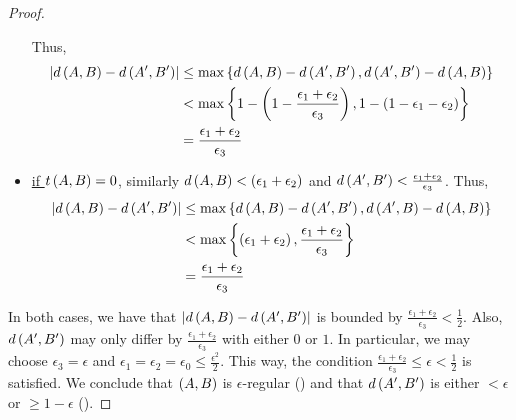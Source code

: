 \begin{lemma}[Lemma 5.17]
\begin{proof}
\begin{itemize}
                    Thus,
                    \begin{align*}
                        \left| d \left( A,B \right) - d \left( A',B' \right) \right|
                            & \leq \max \left\{ d \left( A,B \right) - d \left( A',B' \right), d \left( A',B' \right) - d \left( A,B \right) \right\} \\
                            & < \max \left\{  1 - \left( 1 - \frac{\epsilon_1 + \epsilon_2}{\epsilon_3} \right),
                                1 - \left( 1 - \epsilon_1 - \epsilon_2 \right) \right\} \\
                            & = \frac{\epsilon_1 + \epsilon_2}{\epsilon_3}
                    \end{align*}
                \item \underline{if $t\left( A,B \right) = 0$}, similarly $d\left( A,B \right) < \left( \epsilon_1 + \epsilon_2 \right)$
                    and $d \left( A',B' \right) < \frac{\epsilon_1 + \epsilon_2}{\epsilon_3}$.
                    Thus,
                    \begin{align*}
                        \left| d \left( A,B \right) - d \left( A',B' \right) \right|
                            & \leq \max \left\{ d \left( A,B \right) - d \left( A',B' \right), d \left( A',B \right) - d \left( A,B \right) \right\} \\
                            & < \max \left\{ \left( \epsilon_1 + \epsilon_2 \right), \frac{\epsilon_1 + \epsilon_2}{\epsilon_3} \right\} \\
                            & = \frac{\epsilon_1 + \epsilon_2}{\epsilon_3}
                    \end{align*}
            \end{itemize}
            In both cases, we have that $\left| d \left( A,B \right) - d \left( A',B' \right) \right|$ is bounded by
            $\frac{\epsilon_1 + \epsilon_2}{\epsilon_3} < \frac{1}{2}$.
            Also, $d \left( A', B' \right)$ may only differ by $\frac{\epsilon_1 + \epsilon_2}{\epsilon_3}$ with either
            $0$ or $1$.
            In particular, we may choose $\epsilon_3 = \epsilon$ and $\epsilon_1 = \epsilon_2 = \epsilon_0 \leq \frac{\epsilon^2}{2}$.
            This way, the condition $\frac{\epsilon_1 + \epsilon_2}{\epsilon_3} \leq \epsilon < \frac{1}{2}$ is satisfied.
            We conclude that $\left( A,B \right)$ is $\epsilon$-regular () and that $d \left( A',B' \right)$ is either
            $< \epsilon$ or $\geq 1 - \epsilon$ ().
        \end{proof}
    \end{lemma}


